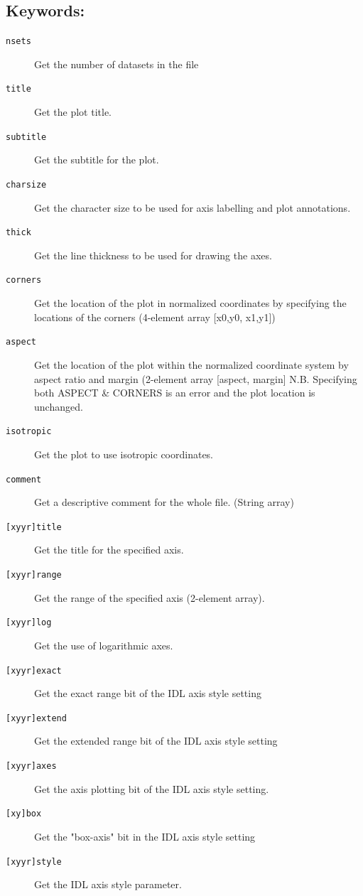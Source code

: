 \documentclass[11pt,twoside,english]{article}
\begin{document}
 \subsection{Keywords:}
 \label{sec:gi_keys}

 \begin{description}
   \item[\texttt{nsets}]	Get the number of datasets in the file
   \item[\texttt{title}]	Get the plot title.
   \item[\texttt{subtitle}]	Get the subtitle for the plot.
   \item[\texttt{charsize}]	Get the character size to be used for
     axis labelling and plot annotations.
   \item[\texttt{thick}]	Get the line thickness to be used for
     drawing the axes.
   \item[\texttt{corners}]	Get the location of the plot in
     normalized coordinates by specifying
     the locations of the corners
     (4-element array [x0,y0, x1,y1])
     \item[\texttt{aspect}]	Get the location of the plot within
       the normalized coordinate system by
       aspect ratio and margin (2-element
       array [aspect, margin]
       N.B. Specifying both ASPECT \&
       CORNERS is an error and the
       plot location is unchanged.
     \item[\texttt{isotropic}]	Get the plot to use isotropic
       coordinates.
     \item[\texttt{comment}]	Get a descriptive comment for the
       whole file. (String array)
     \item[\texttt{[xyyr]title}]	Get the title for the specified axis.
     \item[\texttt{[xyyr]range}]	Get the range of the specified axis
       (2-element array).
     \item[\texttt{[xyyr]log}]	Get  the use of logarithmic
       axes.
     \item[\texttt{[xyyr]exact}]	Get  the exact range bit of
       the IDL axis style setting
     \item[\texttt{[xyyr]extend}]	Get  the extended range bit of
       the IDL axis style setting
     \item[\texttt{[xyyr]axes}]	Get  the axis plotting bit of
       the IDL axis style setting.
     \item[\texttt{[xy]box}]	Get  the "box-axis" bit in the
       IDL axis style setting
     \item[\texttt{[xyyr]style}]	Get the IDL axis style parameter.

\end{description}
\end{document}
